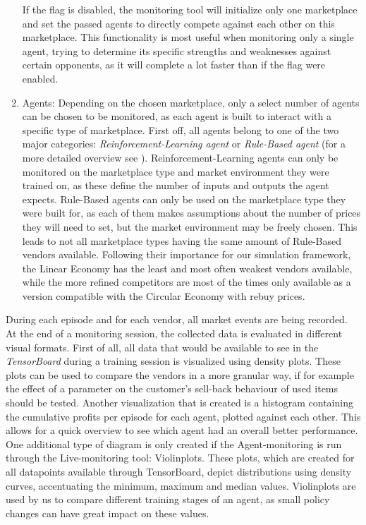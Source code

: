 \begin{enumerate}
	If the flag is disabled, the monitoring tool will initialize only one marketplace and set the passed agents to directly compete against each other on this marketplace. This functionality is most useful when monitoring only a single agent, trying to determine its specific strengths and weaknesses against certain opponents, as it will complete a lot faster than if the flag were enabled.
	\item Agents: Depending on the chosen marketplace, only a select number of agents can be chosen to be monitored, as each agent is built to interact with a specific type of marketplace. First off, all agents belong to one of the two major categories: \emph{Reinforcement-Learning agent} or \emph{Rule-Based agent} (for a more detailed overview see ). Reinforcement-Learning agents can only be monitored on the marketplace type and market environment they were trained on, as these define the number of inputs and outputs the agent expects. Rule-Based agents can only be used on the marketplace type they were built for, as each of them makes assumptions about the number of prices they will need to set, but the market environment may be freely chosen. This leads to not all marketplace types having the same amount of Rule-Based vendors available. Following their importance for our simulation framework, the Linear Economy has the least and most often weakest vendors available, while the more refined competitors are most of the times only available as a version compatible with the Circular Economy with rebuy prices.
\end{enumerate}

During each episode and for each vendor, all market events are being recorded. At the end of a monitoring session, the collected data is evaluated in different visual formats. First of all, all data that would be available to see in the \emph{TensorBoard} during a training session is visualized using density plots. These plots can be used to compare the vendors in a more granular way, if for example the effect of a parameter on the customer's sell-back behaviour of used items should be tested. Another visualization that is created is a histogram containing the cumulative profits per episode for each agent, plotted against each other. This allows for a quick overview to see which agent had an overall better performance. One additional type of diagram is only created if the Agent-monitoring is run through the Live-monitoring tool: Violinplots. These plots, which are created for all datapoints available through TensorBoard, depict distributions using density curves, accentuating the minimum, maximum and median values. Violinplots are used by us to compare different training stages of an agent, as small policy changes can have great impact on these values.

